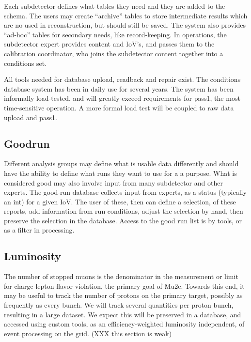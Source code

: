 Each subdetector defines what tables they need and they are added to the schema. The users may create ``archive'' tables to store intermediate results which are no used in reconstruction, but should still be saved.  The system also provides ``ad-hoc'' tables for secondary needs, like record-keeping. In operations, the subdetector expert provides content and IoV's, and passes them to the calibration coordinator, who joins the subdetector content together into a conditions set.

All tools needed for database upload, readback and repair exist.  The conditions database system has been in daily use for several years.  The system has been informally load-tested, and will greatly exceed requirements for pass1, the most time-sensitive operation.  A more formal load test will be coupled to raw data upload and pass1.

\subsection{Goodrun} \label{database-goodrun}
Different analysis groups may define what is usable data differently and should have the ability to define what runs they want to use for a a purpose.  What is considered good may also involve input from many subdetector and other experts. The good-run database collects input from experts, as a status (typically an int) for a given IoV.  The user of these, then can define a selection, of these reports, add information from run conditions, adjust the selection by hand, then preserve the selection in the database.  Access to the good run list is by tools, or as a filter in processing.

\subsection{Luminosity} \label{database-luminosity}
The number of stopped muons is the denominator in the measurement or limit for charge lepton flavor violation, the primary goal of Mu2e.  Towards this end, it may be useful to track the number of protons on the primary target, possibly as frequently as every bunch.  We will track several quantities per proton bunch, resulting in a large dataset.  We expect this will be preserved in a database, and accessed using custom tools, as an efficiency-weighted luminosity independent, of event processing on the grid. (XXX this section is weak)

